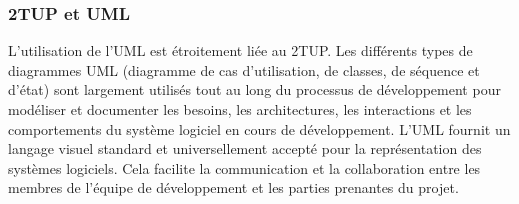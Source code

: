 %
%
%
%
%



\subsubsection{2TUP et UML}
L’utilisation de l’UML est étroitement liée au 2TUP. Les différents types de
diagrammes UML (diagramme de cas d’utilisation, de classes, de séquence et d’état)
sont largement utilisés tout au long du processus de développement pour modéliser
et documenter les besoins, les architectures, les interactions et les comportements
du système logiciel en cours de développement. L’UML fournit un langage visuel
standard et universellement accepté pour la représentation des systèmes logiciels.
Cela facilite la communication et la collaboration entre les membres de l’équipe
de développement et les
parties prenantes du projet.


